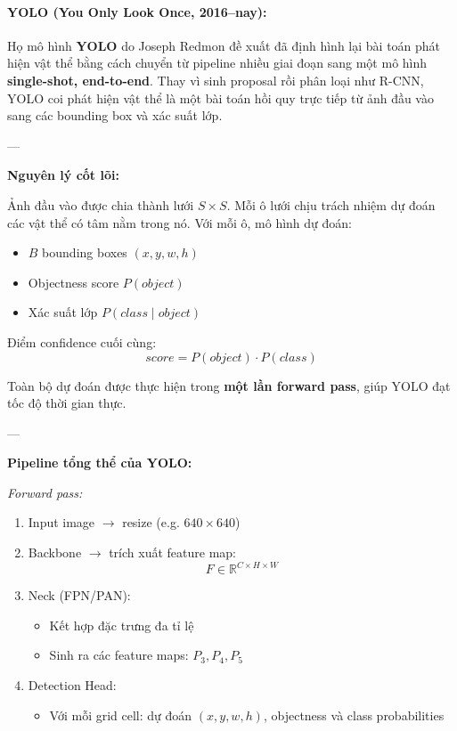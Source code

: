 \paragraph{YOLO (You Only Look Once, 2016–nay):}

Họ mô hình \textbf{YOLO} \cite{Redmon2016} do Joseph Redmon đề xuất đã định hình lại bài toán phát hiện vật thể bằng cách chuyển từ pipeline nhiều giai đoạn sang một mô hình \textbf{single-shot, end-to-end}. Thay vì sinh proposal rồi phân loại như R-CNN, YOLO coi phát hiện vật thể là một bài toán hồi quy trực tiếp từ ảnh đầu vào sang các bounding box và xác suất lớp.

---

\textbf{Nguyên lý cốt lõi:}

Ảnh đầu vào được chia thành lưới $S \times S$. Mỗi ô lưới chịu trách nhiệm dự đoán các vật thể có tâm nằm trong nó. Với mỗi ô, mô hình dự đoán:
\begin{itemize}
\item $B$ bounding boxes $(x, y, w, h)$
\item Objectness score $P(object)$
\item Xác suất lớp $P(class \mid object)$
\end{itemize}

Điểm confidence cuối cùng:
\[
score = P(object) \cdot P(class)
\]

Toàn bộ dự đoán được thực hiện trong \textbf{một lần forward pass}, giúp YOLO đạt tốc độ thời gian thực.

---

\textbf{Pipeline tổng thể của YOLO:}

\textit{Forward pass:}
\begin{enumerate}
\item Input image $\rightarrow$ resize (e.g. $640 \times 640$)
\item Backbone $\rightarrow$ trích xuất feature map:
\[
F \in \mathbb{R}^{C \times H \times W}
\]
\item Neck (FPN/PAN):
\begin{itemize}
	\item Kết hợp đặc trưng đa tỉ lệ
	\item Sinh ra các feature maps: $P_3, P_4, P_5$
\end{itemize}
\item Detection Head:
\begin{itemize}
	\item Với mỗi grid cell: dự đoán $(x, y, w, h)$, objectness và class probabilities
\end{itemize}
\end{enumerate}

